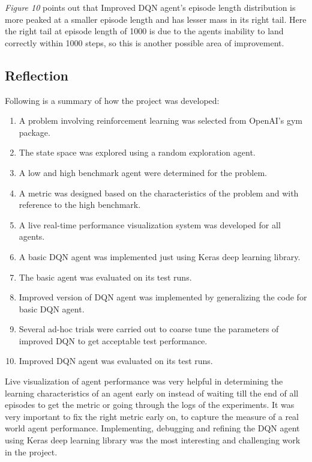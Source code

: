 \documentclass{article}
\begin{document}
\textit{Figure 10} points out that Improved DQN agent's episode length distribution is more peaked at a smaller episode length and has lesser mass in its right tail. Here the right tail at episode length of 1000 is due to the agents inability to land correctly within 1000 steps, so this is another possible area of improvement.
\subsection*{Reflection}
Following is a summary of how the project was developed:
\begin{enumerate}
	\item A problem involving reinforcement learning was selected from OpenAI's gym package.
	\item The state space was explored using a random exploration agent.
	\item A low and high benchmark agent were determined for the problem.
	\item A metric was designed based on the characteristics of the problem and with reference to the high benchmark.
	\item A live real-time performance visualization system was developed for all agents.
	\item A basic DQN agent was implemented just using Keras deep learning library.
	\item The basic agent was evaluated on its test runs.
	\item Improved version of DQN agent was implemented by generalizing the code for basic DQN agent.
	\item Several ad-hoc trials were carried out to coarse tune the parameters of improved DQN to get acceptable test performance.
	\item Improved DQN agent was evaluated on its test runs.
\end{enumerate}
Live visualization of agent performance was very helpful in determining the learning characteristics of an agent early on instead of waiting till the end of all episodes to get the metric or going through the logs of the experiments. It was very important to fix the right metric early on, to capture the measure of a real world agent performance. Implementing, debugging and refining the DQN agent using Keras deep learning library was the most interesting and challenging work in the project.
\end{document}
